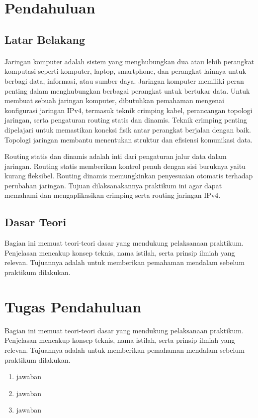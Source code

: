 \section{Pendahuluan}
\subsection{Latar Belakang}
\paragraph{} 
Jaringan komputer adalah sistem yang menghubungkan dua atau lebih perangkat komputasi seperti komputer, laptop, smartphone, dan perangkat lainnya untuk berbagi data, informasi, atau sumber daya. Jaringan komputer memiliki peran penting dalam menghubungkan berbagai perangkat untuk bertukar data. Untuk membuat sebuah jaringan komputer, dibutuhkan pemahaman mengenai konfigurasi jaringan IPv4, termasuk teknik crimping kabel, perancangan topologi jaringan, serta pengaturan routing statis dan dinamis. Teknik crimping penting dipelajari untuk memastikan koneksi fisik antar perangkat berjalan dengan baik. Topologi jaringan membantu menentukan struktur dan efisiensi komunikasi data.

Routing statis dan dinamis adalah inti dari pengaturan jalur data dalam jaringan. Routing statis memberikan kontrol penuh dengan sisi buruknya yaitu kurang fleksibel. Routing dinamis memungkinkan penyesuaian otomatis terhadap perubahan jaringan. Tujuan dilaksanakannya praktikum ini agar dapat memahami dan mengaplikasikan crimping serta routing jaringan IPv4.
\subsection{Dasar Teori}
Bagian ini memuat teori-teori dasar yang mendukung pelaksanaan praktikum. Penjelasan mencakup konsep teknis, nama istilah, serta prinsip ilmiah yang relevan. Tujuannya adalah untuk memberikan pemahaman mendalam sebelum praktikum dilakukan.

\section{Tugas Pendahuluan}
Bagian ini memuat teori-teori dasar yang mendukung pelaksanaan praktikum. Penjelasan mencakup konsep teknis, nama istilah, serta prinsip ilmiah yang relevan. Tujuannya adalah untuk memberikan pemahaman mendalam sebelum praktikum dilakukan.
\begin{enumerate}
	\item jawaban
	\item jawaban
	\item jawaban
\end{enumerate}